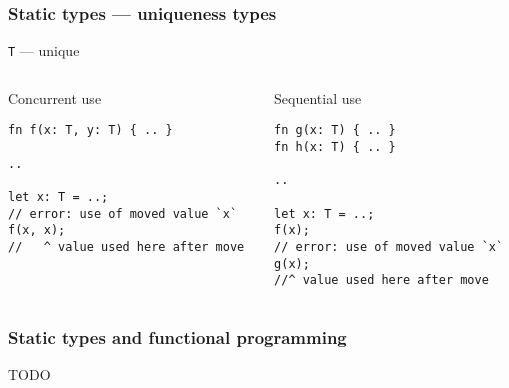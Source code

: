 \documentclass[t]{beamer}
\begin{document}
\begin{frame}[fragile]
\frametitle{Static types --- uniqueness types}

\texttt{T} --- unique
  
\begin{columns}

\begin{column}[T]{0.48\textwidth}
\begin{block}{Concurrent use}
\small
\begin{verbatim}
fn f(x: T, y: T) { .. }

..

let x: T = ..;
// error: use of moved value `x`
f(x, x);
//   ^ value used here after move
\end{verbatim}
\end{block}
\end{column}

\begin{column}[T]{0.48\textwidth}
\begin{block}{Sequential use}
\small
\begin{verbatim}
fn g(x: T) { .. }
fn h(x: T) { .. }

..

let x: T = ..;
f(x);
// error: use of moved value `x`
g(x);
//^ value used here after move
\end{verbatim}
\end{block}
\end{column}

\end{columns}

\end{frame}


\begin{frame}[c,fragile]
\frametitle{Static types and functional programming}
\begin{comment}
There's a deep theoretical reason that types are associated with functional programming.
The lambda calculus is a turing-complete model of computation which consists *only* of
functions. The definitive functional programming language. There are ways of defining
type systems for the lambda calculus that are equivalent to mathematical logics. In this
setting, a type is equivalent to a proposition, and a well-typed lambda calculus program
is a proof of that proposition. This is known as the Curry-Howard correspondence and I
think Donovan will be covering it in more detail next month. 

Given this, some people might suggest that a functional programming language is one
that corresponds to a logic via Curry-Howard.

The validity of "types as propositions and proofs as programs" for a programming
language requires type checking of that language to be decidable.

Rust's type checker is known to be undecidable. It's possible to write Rust programs
that would take an infinite amount of time to type check. I think it's nearly impossible
in a typical software engineering context.
\end{comment}

TODO

\end{frame}
\end{document}
